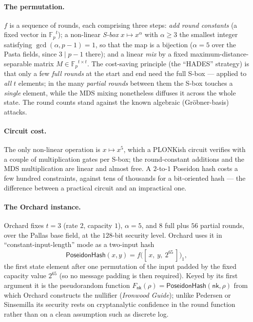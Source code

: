 \documentclass[11pt,a4paper]{article}
\theoremstyle{definition}
\theoremstyle{remark}
\newcommand{\Fp}{\ensuremath{\mathbb{F}_{p}}}
\begin{document}
\paragraph{The permutation.} \(f\) is a sequence of rounds, each comprising three steps:
\emph{add round constants} (a fixed vector in \(\Fp^{t}\)); a non-linear
\emph{S-box} \(x \mapsto x^{\alpha}\) with \(\alpha \ge 3\) the smallest integer
satisfying \(\gcd(\alpha, p-1) = 1\), so that the map is a bijection
(\(\alpha = 5\) over the Pasta fields, since \(3 \mid p - 1\) there); and a
linear \emph{mix} by a fixed maximum-distance-separable matrix \(M \in
\Fp^{t\times t}\). The cost-saving principle (the ``HADES'' strategy) is that only a few
\emph{full rounds} at the start and end need the full S-box --- applied to \emph{all} \(t\)
elements; in the many \emph{partial rounds} between
them the S-box touches a \emph{single} element, while the MDS mixing nonetheless
diffuses it across the whole state. The round counts stand against the known
algebraic (Gr\"obner-basis) attacks.

\paragraph{Circuit cost.} The only non-linear operation is
\(x \mapsto x^{5}\), which a PLONKish circuit verifies with a couple of
multiplication gates per S-box; the round-constant additions and the MDS multiplication
are linear and almost free. A \(2\)-to-\(1\) Poseidon hash costs a few hundred
constraints, against tens of thousands for a bit-oriented hash --- the difference
between a practical circuit and an impractical one.

\paragraph{The Orchard instance.} Orchard fixes \(t = 3\) (rate \(2\), capacity
\(1\)), \(\alpha = 5\), and \(8\) full plus \(56\) partial rounds, over the Pallas
base field, at the \(128\)-bit security level. Orchard uses it in
``constant-input-length'' mode as a two-input hash
\[
  \mathsf{PoseidonHash}(x,y) = f\bigl([\,x,\ y,\ 2^{65}\,]\bigr)_{1},
\]
the first state element after one permutation of the input padded by the fixed
capacity value \(2^{65}\) (so no message padding is then required). Keyed by its first
argument it is the pseudorandom function \(F_{\mathsf{nk}}(\rho) =
\mathsf{PoseidonHash}(\mathsf{nk}, \rho)\) from which Orchard constructs the nullifier
(\emph{Ironwood Guide}); unlike Pedersen or Sinsemilla its security rests on
cryptanalytic confidence in the round function rather than on a clean assumption
such as discrete log.
\end{document}
